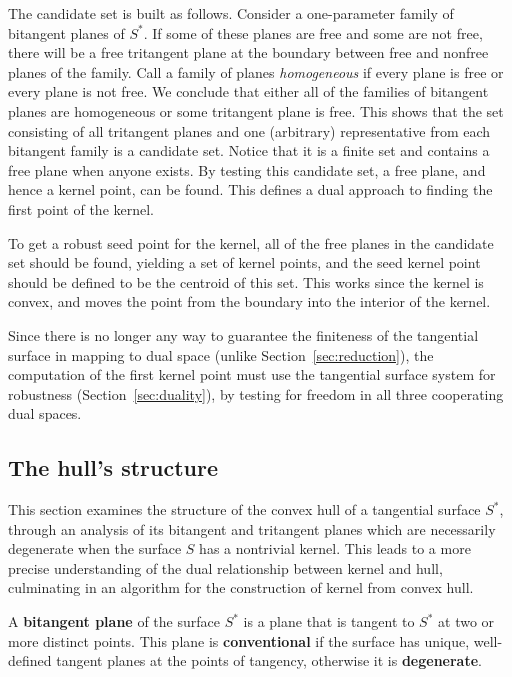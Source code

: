 \documentclass[doublespacing]{elsart}
\begin{document}
The candidate set is built as follows.
Consider a one-parameter family of bitangent planes of $S^*$.
If some of these planes are free and some are not free,
there will be a free tritangent plane at the boundary
between free and nonfree planes of the family.
Call a family of planes {\em homogeneous} if every plane is
free or every plane is not free.
We conclude that either all of the families of bitangent planes
are homogeneous or some tritangent plane is free.
This shows that the set consisting of all tritangent planes
and one (arbitrary) representative from each bitangent family
is a candidate set.
Notice that it is a finite set and contains a free plane when anyone exists.
By testing this candidate set, a free plane, and hence a kernel point, can be found.
This defines a dual approach to finding the first point of the kernel.

To get a robust seed point for the kernel,
all of the free planes in the candidate set should be found,
yielding a set of kernel points, and the seed kernel point 
should be defined to be the centroid of this set.
This works since the kernel is convex, and moves the point from the boundary
into the interior of the kernel.

Since there is no longer any way to guarantee the finiteness of the tangential surface
in mapping to dual space (unlike Section~\ref{sec:reduction}),
the computation of the first kernel point must use the tangential surface system 
for robustness (Section~\ref{sec:duality}),
by testing for freedom in all three cooperating dual spaces.


\subsection{The hull's structure}
\label{sec:cusp}

This section examines the structure of the convex hull of a tangential
surface $S^*$, through an analysis of its bitangent and tritangent planes
which are necessarily degenerate when the surface $S$ has a nontrivial kernel.
This leads to a more precise understanding of the 
dual relationship between kernel and hull, culminating in an
algorithm for the construction of kernel from convex hull.

\begin{defn2}
A {\bf bitangent plane} of the surface $S^*$ is a plane that
is tangent to $S^*$ at two or more distinct points.
This plane is {\bf conventional} if the surface has unique, well-defined 
tangent planes at the points of tangency,
otherwise it is {\bf degenerate}.
\end{defn2}
\end{document}
